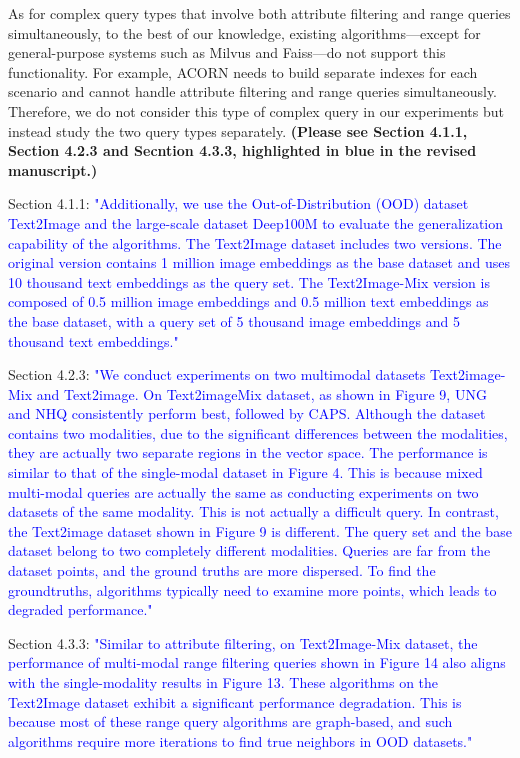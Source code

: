 \documentclass[sigconf, nonacm]{acmart}
\begin{document}
As for complex query types that involve both attribute filtering and range queries simultaneously, to the best of our knowledge, existing algorithms—except for general-purpose systems such as Milvus and Faiss—do not support this functionality. For example, ACORN needs to build separate indexes for each scenario and cannot handle attribute filtering and range queries simultaneously. Therefore, we do not consider this type of complex query in our experiments but instead study the two query types separately. \textbf{(Please see Section 4.1.1, Section 4.2.3 and Secntion 4.3.3, highlighted in blue in the revised manuscript.)  
}

Section 4.1.1:\textcolor{blue}{
"Additionally, we use the Out-of-Distribution (OOD) dataset Text2Image and the large-scale dataset Deep100M to evaluate the generalization capability of the algorithms. The Text2Image dataset includes two versions. The original version contains 1 million image embeddings as the base dataset and uses 10 thousand text embeddings as the query set. The Text2Image-Mix version is composed of 0.5 million image embeddings and 0.5 million text embeddings as the base dataset, with a query set of 5 thousand image embeddings and 5 thousand text embeddings."
}

Section 4.2.3: \textcolor{blue}{
	"We conduct experiments on two multimodal datasets Text2image-Mix and Text2image. On Text2imageMix dataset, as shown in Figure 9, UNG and NHQ consistently perform best, followed by CAPS. Although the dataset contains two modalities, due to the significant differences between the modalities, they are actually two separate regions in the vector space. The performance is similar to that of the single-modal dataset in Figure 4. This is because mixed multi-modal queries are actually the same as conducting experiments on two datasets of the same modality. This is not actually a difficult query. In contrast, the Text2image dataset shown in Figure 9 is different. The query set and the base dataset belong to two completely different modalities. Queries are far from the dataset points, and the ground truths are more dispersed. To find the groundtruths, algorithms typically need to examine more points, which leads to degraded performance." 
}

Section 4.3.3:\textcolor{blue}{
		"Similar to attribute filtering, on Text2Image-Mix dataset, the performance of multi-modal range filtering queries shown in Figure 14 also aligns with the single-modality results in Figure 13. These algorithms on the Text2Image dataset exhibit a significant performance degradation. This is because most of these range query algorithms are graph-based, and such algorithms require more iterations to find true neighbors in OOD datasets."
}
\end{document}
